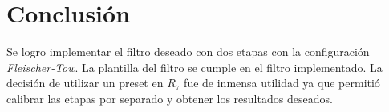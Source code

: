 \section{Conclusión}
Se logro implementar el filtro deseado con dos etapas con la configuración \textit{Fleischer-Tow}. La plantilla del filtro se cumple en el filtro implementado. La decisión de utilizar un preset en $R_7$ fue de inmensa utilidad ya que permitió calibrar las etapas por separado y obtener los resultados deseados. 



